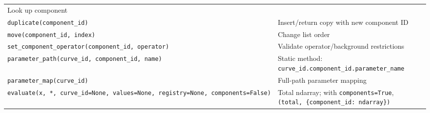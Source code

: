 \documentclass[
  10pt,
  a4paper,
  oneside]{scrreprt}
\begin{document}
\begin{longtable}[]{@{}ll@{}}
\begin{minipage}[t]{0.47\columnwidth}
Look up component\strut
\end{minipage}\tabularnewline
\begin{minipage}[t]{0.47\columnwidth}\raggedright
\texttt{duplicate(component\_id)}\strut
\end{minipage} & \begin{minipage}[t]{0.47\columnwidth}\raggedright
Insert/return copy with new component ID\strut
\end{minipage}\tabularnewline
\begin{minipage}[t]{0.47\columnwidth}\raggedright
\texttt{move(component\_id,\ index)}\strut
\end{minipage} & \begin{minipage}[t]{0.47\columnwidth}\raggedright
Change list order\strut
\end{minipage}\tabularnewline
\begin{minipage}[t]{0.47\columnwidth}\raggedright
\texttt{set\_component\_operator(component\_id,\ operator)}\strut
\end{minipage} & \begin{minipage}[t]{0.47\columnwidth}\raggedright
Validate operator/background restrictions\strut
\end{minipage}\tabularnewline
\begin{minipage}[t]{0.47\columnwidth}\raggedright
\texttt{parameter\_path(curve\_id,\ component\_id,\ name)}\strut
\end{minipage} & \begin{minipage}[t]{0.47\columnwidth}\raggedright
Static method: \texttt{curve\_id.component\_id.parameter\_name}\strut
\end{minipage}\tabularnewline
\begin{minipage}[t]{0.47\columnwidth}\raggedright
\texttt{parameter\_map(curve\_id)}\strut
\end{minipage} & \begin{minipage}[t]{0.47\columnwidth}\raggedright
Full-path parameter mapping\strut
\end{minipage}\tabularnewline
\begin{minipage}[t]{0.47\columnwidth}\raggedright
\texttt{evaluate(x,\ *,\ curve\_id=None,\ values=None,\ registry=None,\ components=False)}\strut
\end{minipage} & \begin{minipage}[t]{0.47\columnwidth}\raggedright
Total ndarray; with \texttt{components=True},
\texttt{(total,\ \{component\_id:\ ndarray\})}\strut
\end{minipage}\tabularnewline

\end{longtable}
\end{document}
